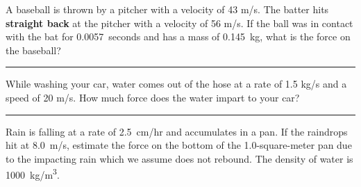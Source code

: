 \documentclass[12pt]{exam}
\begin{document}
\begin{questions}

\Large

\question 
    A baseball is thrown by a pitcher with a velocity of 43 m/s. The batter hits {\bf straight back} at the pitcher with a velocity of 56 m/s. If the ball was in contact with the bat for 0.0057~seconds and has a mass of 0.145~kg, what is the force on the baseball?

\vs \hrule \vs  

\question
  While washing your car, water comes out of the hose at a rate of 1.5 kg/s and a speed of 20 m/s.  How much force does the water impart to your car?


\vs \hrule \vs  

\question
  Rain is falling at a rate of 2.5~cm/hr and accumulates in a pan.  If the raindrops hit at 8.0~m/s, estimate the force on the bottom of the 1.0-square-meter pan due to the impacting rain which we assume does not rebound.  The density of water is \SI{1000}{kg/m^3}.  


\end{questions}
\end{document}
